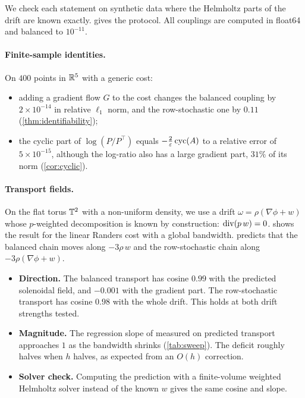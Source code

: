 We check each statement on synthetic data where the Helmholtz parts of the
drift are known exactly.  gives the protocol. All
couplings are computed in float64 and balanced to $10^{-11}$.

\paragraph{Finite-sample identities.}
On $400$ points in $\mathbb{R}^5$ with a generic cost:
\begin{itemize}
  \item adding a gradient flow $G$ to the cost changes the balanced
    coupling by $2\times10^{-14}$ in relative $\ell_1$ norm, and the
    row-stochastic one by $0.11$ (\cref{thm:identifiability});
  \item the cyclic part of $\log(P/P^\top)$ equals $-\tfrac2{\varepsilon}\operatorname{cyc}(A)$ to
    a relative error of $5\times10^{-15}$, although the log-ratio also has
    a large gradient part, $31\%$ of its norm (\cref{cor:cyclic}).
\end{itemize}

\paragraph{Transport fields.}
On the flat torus $\mathbb{T}^2$ with a non-uniform density, we use a drift
$\omega=\rho(\nabla\phi+w)$ whose $p$-weighted decomposition is known by
construction: $\operatorname{div}(p\,w)=0$.  shows the result for the
linear Randers cost with a global bandwidth.  predicts
that the balanced chain moves along $-3\rho\,w$ and the row-stochastic chain
along $-3\rho(\nabla\phi+w)$.
\begin{itemize}
  \item \textbf{Direction.} The balanced transport has cosine $0.99$ with
    the predicted solenoidal field, and $-0.001$ with the gradient part.
    The row-stochastic transport has cosine $0.98$ with the whole drift.
    This holds at both drift strengths tested.
  \item \textbf{Magnitude.} The regression slope of measured on predicted
    transport approaches $1$ as the bandwidth shrinks (\cref{tab:sweep}).
    The deficit roughly halves when $h$ halves, as expected from an $O(h)$
    correction.
  \item \textbf{Solver check.} Computing the prediction with a finite-volume
    weighted Helmholtz solver instead of the known $w$ gives the same
    cosine and slope.
\end{itemize}

